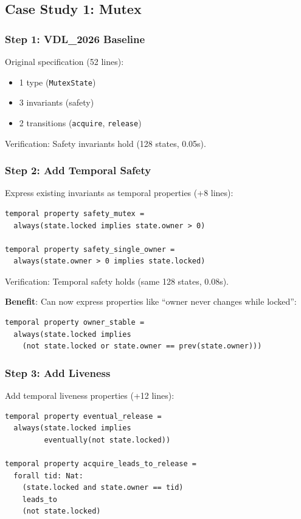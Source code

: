 \documentclass[conference]{IEEEtran}
\begin{document}
\subsection{Case Study 1: Mutex}

\subsubsection{Step 1: VDL\_2026 Baseline}

Original specification (52 lines):
\begin{itemize}
\item 1 type (\texttt{MutexState})
\item 3 invariants (safety)
\item 2 transitions (\texttt{acquire}, \texttt{release})
\end{itemize}

Verification: Safety invariants hold (128 states, 0.05s).

\subsubsection{Step 2: Add Temporal Safety}

Express existing invariants as temporal properties (+8 lines):

\begin{lstlisting}[caption={Step 2: Temporal safety}]
temporal property safety_mutex =
  always(state.locked implies state.owner > 0)

temporal property safety_single_owner =
  always(state.owner > 0 implies state.locked)
\end{lstlisting}

Verification: Temporal safety holds (same 128 states, 0.08s).

\textbf{Benefit}: Can now express properties like ``owner never changes while locked'':

\begin{lstlisting}
temporal property owner_stable =
  always(state.locked implies
    (not state.locked or state.owner == prev(state.owner)))
\end{lstlisting}

\subsubsection{Step 3: Add Liveness}

Add temporal liveness properties (+12 lines):

\begin{lstlisting}[caption={Step 3: Temporal liveness}]
temporal property eventual_release =
  always(state.locked implies
         eventually(not state.locked))

temporal property acquire_leads_to_release =
  forall tid: Nat:
    (state.locked and state.owner == tid)
    leads_to
    (not state.locked)
\end{lstlisting}
\end{document}
